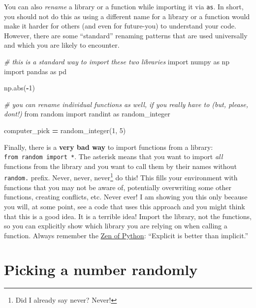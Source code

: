 \documentclass[
]{book}
\newenvironment{Shaded}{\begin{snugshade}}{\end{snugshade}}
\newcommand{\BuiltInTok}[1]{#1}
\newcommand{\CommentTok}[1]{\textcolor[rgb]{0.56,0.35,0.01}{\textit{#1}}}
\newcommand{\DecValTok}[1]{\textcolor[rgb]{0.00,0.00,0.81}{#1}}
\newcommand{\ImportTok}[1]{#1}
\newcommand{\NormalTok}[1]{#1}
\newcommand{\OperatorTok}[1]{\textcolor[rgb]{0.81,0.36,0.00}{\textbf{#1}}}
\begin{document}
You can also \emph{rename} a library or a function while importing it via \texttt{as}. In short, you should not do this as using a different name for a library or a function would make it harder for others (and even for future-you) to understand your code. However, there are some ``standard'' renaming patterns that are used universally and which you are likely to encounter.

\begin{Shaded}
\begin{Highlighting}[]
\CommentTok{\# this is a standard way to import these two libraries}
\ImportTok{import}\NormalTok{ numpy }\ImportTok{as}\NormalTok{ np}
\ImportTok{import}\NormalTok{ pandas }\ImportTok{as}\NormalTok{ pd}

\NormalTok{np.}\BuiltInTok{abs}\NormalTok{(}\OperatorTok{{-}}\DecValTok{1}\NormalTok{)}

\CommentTok{\# you can rename individual functions as well, if you really have to (but, please, don\textquotesingle{}t!)}
\ImportTok{from}\NormalTok{ random }\ImportTok{import}\NormalTok{ randint }\ImportTok{as}\NormalTok{ random\_integer}

\NormalTok{computer\_pick }\OperatorTok{=}\NormalTok{ random\_integer(}\DecValTok{1}\NormalTok{, }\DecValTok{5}\NormalTok{)}
\end{Highlighting}
\end{Shaded}

Finally, there is a \textbf{very bad way} to import functions from a library: \texttt{from\ random\ import\ *}. The asterisk means that you want to import \emph{all} functions from the library and you want to call them by their names without \texttt{random.} prefix. Never, never, never\footnote{Did I already say never? Never!} do this! This fills your environment with functions that you may not be aware of, potentially overwriting some other functions, creating conflicts, etc. Never ever! I am showing you this only because you will, at some point, see a code that uses this approach and you might think that this is a good idea. It is a terrible idea! Import the library, not the functions, so you can explicitly show which library you are relying on when calling a function. Always remember the \href{https://www.python.org/dev/peps/pep-0020/}{Zen of Python}: ``Explicit is better than implicit.''

\hypertarget{picking-a-number-randomly}{%
\section{Picking a number randomly}\label{picking-a-number-randomly}}
\end{document}
